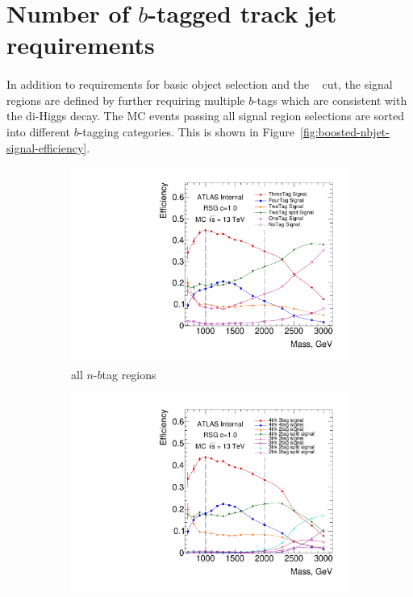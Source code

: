 \section{Number of $b$-tagged track jet requirements}
\paragraph{}
In addition to requirements for basic object selection and the \Xhh~ cut, the signal regions are defined by further requiring multiple $b$-tags which are consistent with the di-Higgs decay.
The MC events passing all signal region selections are sorted into different $b$-tagging categories. 
This is shown in Figure~\ref{fig:boosted-nbjet-signal-efficiency}. 

\begin{figure}[htbp!]
    \captionsetup{justification=centering}
    \begin{subfigure}[b]{0.45\textwidth}
        \includegraphics[width=\textwidth,angle=-90]{figures/boosted/SigEff/region_lst_Moriond_Efficiency_AllTag_Signal.pdf}
        \caption{all $n$-$b$tag regions}
        \label{fig:boosted-nbjet-signal-efficiency-region}
    \end{subfigure}
    \quad
    \begin{subfigure}[b]{0.45\textwidth}
        \includegraphics[width=\textwidth,angle=-90]{figures/boosted/SigEff/detail_lst_Moriond_Efficiency_AllTag_Signal.pdf}

\end{subfigure}
\end{figure}

